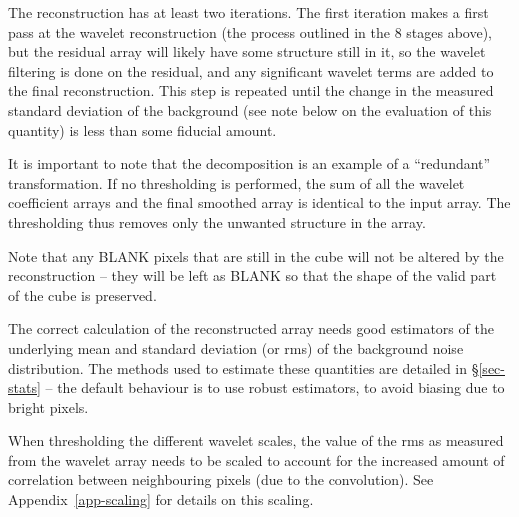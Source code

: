 The reconstruction has at least two iterations. The first iteration
makes a first pass at the wavelet reconstruction (the process outlined
in the 8 stages above), but the residual array will likely have some
structure still in it, so the wavelet filtering is done on the
residual, and any significant wavelet terms are added to the final
reconstruction. This step is repeated until the change in the measured
standard deviation of the background (see note below on the evaluation
of this quantity) is less than some fiducial amount.

It is important to note that the \atrous decomposition is an example
of a ``redundant'' transformation. If no thresholding is performed,
the sum of all the wavelet coefficient arrays and the final smoothed
array is identical to the input array. The thresholding thus removes
only the unwanted structure in the array.

Note that any BLANK pixels that are still in the cube will not be
altered by the reconstruction -- they will be left as BLANK so that
the shape of the valid part of the cube is preserved.


The correct calculation of the reconstructed array needs good
estimators of the underlying mean and standard deviation (or rms) of
the background noise distribution. The methods used to estimate these
quantities are detailed in \S\ref{sec-stats} -- the default behaviour
is to use robust estimators, to avoid biasing due to bright pixels.


When thresholding the different wavelet scales, the value of the rms
as measured from the wavelet array needs to be scaled to account for
the increased amount of correlation between neighbouring pixels (due
to the convolution). See Appendix~\ref{app-scaling} for details on
this scaling.

